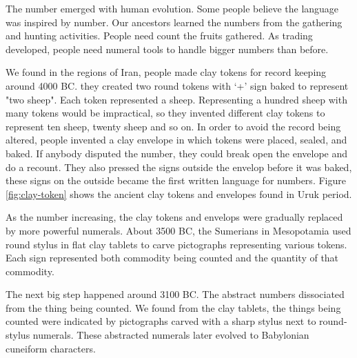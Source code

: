\documentclass[UTF8]{article}
\begin{document}
The number emerged with human evolution. Some people believe the language was inspired by number. Our ancestors learned the numbers from the gathering and hunting activities. People need count the fruits gathered. As trading developed, people need numeral tools to handle bigger numbers than before.

We found in the regions of Iran, people made clay tokens for record keeping around 4000 BC. they created two round tokens with `+' sign baked to represent "two sheep". Each token represented a sheep. Representing a hundred sheep with many tokens would be impractical, so they invented different clay tokens to represent ten sheep, twenty sheep and so on. In order to avoid the record being altered, people invented a clay envelope in which tokens were placed, sealed, and baked. If anybody disputed the number, they could break open the envelope and do a recount. They also pressed the signs outside the envelop before it was baked, these signs on the outside became the first written language for numbers\cite{Calvin-Clawson-1994}. Figure \ref{fig:clay-token} shows the ancient clay tokens and envelopes found in Uruk period.

As the number increasing, the clay tokens and envelops were gradually replaced by more powerful numerals. About 3500 BC, the Sumerians in Mesopotamia used round stylus in flat clay tablets to carve pictographs representing various tokens. Each sign represented both commodity being counted and the quantity of that commodity.

The next big step happened around 3100 BC. The abstract numbers dissociated from the thing being counted. We found from the clay tablets, the things being counted were indicated by pictographs carved with a sharp stylus next to round-stylus numerals. These abstracted numerals later evolved to Babylonian cuneiform characters.
\end{document}
